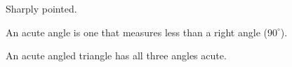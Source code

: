 Sharply pointed.
\par
An acute angle is one that measures less than a right angle  ($90^{\circ}$).
\par
An acute angled triangle has all three angles acute.